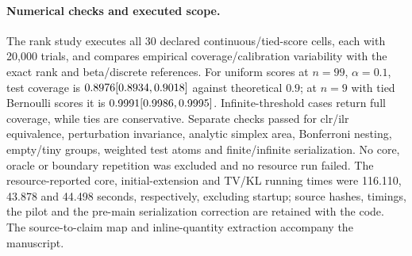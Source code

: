 \paragraph{Numerical checks and executed scope.}
The rank study executes all 30 declared continuous/tied-score cells, each with 20,000 trials, and compares empirical coverage/calibration variability with the exact rank and beta/discrete references. For uniform scores at $n=99$, $\alpha=0.1$, test coverage is $0.8976 [0.8934, 0.9018]{}$ against theoretical $0.9$; at $n=9$ with tied Bernoulli scores it is $0.9991 [0.9986, 0.9995]{}$. Infinite-threshold cases return full coverage, while ties are conservative. Separate checks passed for clr/ilr equivalence, perturbation invariance, analytic simplex area, Bonferroni nesting, empty/tiny groups, weighted test atoms and finite/infinite serialization. No core, oracle or boundary repetition was excluded and no resource run failed. The resource-reported core, initial-extension and TV/KL running times were 116.110, 43.878 and 44.498 seconds, respectively, excluding startup; source hashes, timings, the pilot and the pre-main serialization correction are retained with the code. The source-to-claim map and inline-quantity extraction accompany the manuscript.
